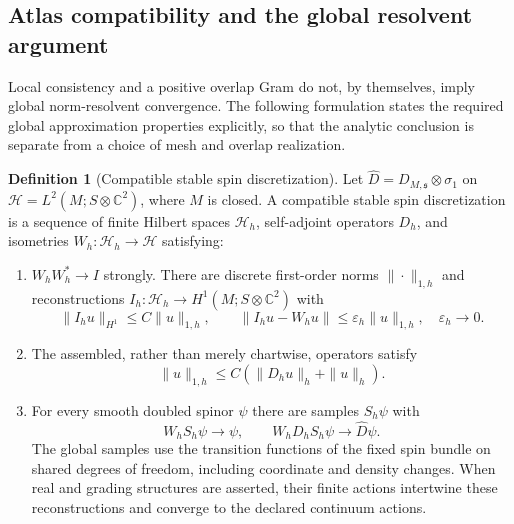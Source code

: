 \documentclass[11pt]{article}
\theoremstyle{definition}
\newtheorem{definition}[definition]{Definition}
\theoremstyle{remark}
\theoremstyle{definition}
\theoremstyle{remark}
\newcommand{\C}{\mathbb C}
\newcommand{\Hh}{\mathcal H}
\begin{document}
\subsection{Atlas compatibility and the global resolvent argument}
\label{subsec:atlas-compatibility}

Local consistency and a positive overlap Gram do not, by themselves, imply
global norm-resolvent convergence.  The following formulation states the
required global approximation properties explicitly, so that the analytic
conclusion is separate from a choice of mesh and overlap realization.

\begin{definition}[Compatible stable spin discretization]
\label{def:stable-spin-atlas}
Let $\widehat D=D_{M,\mathfrak s}\otimes\sigma_1$ on
$\mathscr H=L^2(M;S\otimes\C^2)$, where $M$ is closed.  A compatible stable
spin discretization is a sequence of finite Hilbert spaces $\Hh_h$, self-adjoint
operators $D_h$, and isometries $W_h:\Hh_h\to\mathscr H$ satisfying:
\begin{enumerate}[label=\textup{(A\arabic*)},leftmargin=3em]
\item $W_hW_h^*\to I$ strongly.  There are discrete first-order norms
$\|\cdot\|_{1,h}$ and reconstructions $I_h:\Hh_h\to H^1(M;S\otimes\C^2)$
with
\begin{equation}
 \|I_hu\|_{H^1}\le C\|u\|_{1,h},\qquad
 \|I_hu-W_hu\|\le\varepsilon_h\|u\|_{1,h},\quad
 \varepsilon_h\longrightarrow0.
 \label{eq:atlas-reconstruction}
\end{equation}
\item The assembled, rather than merely chartwise, operators satisfy
\begin{equation}
 \|u\|_{1,h}\le C(\|D_hu\|_h+\|u\|_h).
 \label{eq:atlas-global-stability}
\end{equation}
\item For every smooth doubled spinor $\psi$ there are samples $S_h\psi$ with
\begin{equation}
 W_hS_h\psi\longrightarrow\psi,\qquad
 W_hD_hS_h\psi\longrightarrow\widehat D\psi.
 \label{eq:atlas-global-core}
\end{equation}
The global samples use the transition functions of the fixed spin bundle on
shared degrees of freedom, including coordinate and density changes.  When
real and grading structures are asserted, their finite actions intertwine
these reconstructions and converge to the declared continuum actions.
\end{enumerate}
\end{definition}
\end{document}
